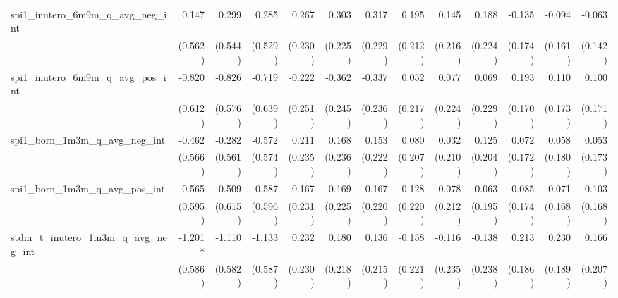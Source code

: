 \begin{tabular}{lrrrrrrrrrrrr}
spi1\_inutero\_6m9m\_q\_avg\_neg\_int       &        0.147 &        0.299 &        0.285 &        0.267 &        0.303 &        0.317 &        0.195 &        0.145 &        0.188 &       -0.135 &       -0.094 &       -0.063 \\ 
                                            &      (0.562) &      (0.544) &      (0.529) &      (0.230) &      (0.225) &      (0.229) &      (0.212) &      (0.216) &      (0.224) &      (0.174) &      (0.161) &      (0.142) \\ 
spi1\_inutero\_6m9m\_q\_avg\_pos\_int       &       -0.820 &       -0.826 &       -0.719 &       -0.222 &       -0.362 &       -0.337 &        0.052 &        0.077 &        0.069 &        0.193 &        0.110 &        0.100 \\ 
                                            &      (0.612) &      (0.576) &      (0.639) &      (0.251) &      (0.245) &      (0.236) &      (0.217) &      (0.224) &      (0.229) &      (0.170) &      (0.173) &      (0.171) \\ 
spi1\_born\_1m3m\_q\_avg\_neg\_int          &       -0.462 &       -0.282 &       -0.572 &        0.211 &        0.168 &        0.153 &        0.080 &        0.032 &        0.125 &        0.072 &        0.058 &        0.053 \\ 
                                            &      (0.566) &      (0.561) &      (0.574) &      (0.235) &      (0.236) &      (0.222) &      (0.207) &      (0.210) &      (0.204) &      (0.172) &      (0.180) &      (0.173) \\ 
spi1\_born\_1m3m\_q\_avg\_pos\_int          &        0.565 &        0.509 &        0.587 &        0.167 &        0.169 &        0.167 &        0.128 &        0.078 &        0.063 &        0.085 &        0.071 &        0.103 \\ 
                                            &      (0.595) &      (0.615) &      (0.596) &      (0.231) &      (0.225) &      (0.220) &      (0.220) &      (0.212) &      (0.195) &      (0.174) &      (0.168) &      (0.168) \\ 
stdm\_t\_inutero\_1m3m\_q\_avg\_neg\_int    &      -1.201* &       -1.110 &       -1.133 &        0.232 &        0.180 &        0.136 &       -0.158 &       -0.116 &       -0.138 &        0.213 &        0.230 &        0.166 \\ 
                                            &      (0.586) &      (0.582) &      (0.587) &      (0.230) &      (0.218) &      (0.215) &      (0.221) &      (0.235) &      (0.238) &      (0.186) &      (0.189) &      (0.207) \\ 

\end{tabular}
